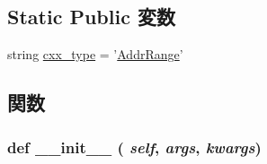 \subsection*{Static Public 変数}
\begin{DoxyCompactItemize}
\item 
string \hyperlink{classm5_1_1params_1_1AddrRange_a2f1553ebb79374a68b36fdd6d8d82fc3}{cxx\_\-type} = '\hyperlink{classm5_1_1params_1_1AddrRange}{AddrRange}'
\end{DoxyCompactItemize}


\subsection{関数}
\hypertarget{classm5_1_1params_1_1AddrRange_ac775ee34451fdfa742b318538164070e}{
\subsubsection[{\_\-\_\-init\_\-\_\-}]{\setlength{\rightskip}{0pt plus 5cm}def \_\-\_\-init\_\-\_\- ( {\em self}, \/   {\em args}, \/   {\em kwargs})}}
\label{classm5_1_1params_1_1AddrRange_ac775ee34451fdfa742b318538164070e}



